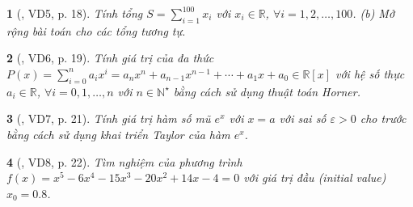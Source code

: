 \documentclass{article}
\newtheorem{baitoan}{}
\begin{document}
\begin{baitoan}[\cite{Doanh_Tuan_Pascal}, VD5, p. 18]
	Tính tổng $S = \sum_{i=1}^{100} x_i$ với $x_i\in\mathbb{R}$, $\forall i = 1,2,\ldots,100$. (b) Mở rộng bài toán cho các tổng tương tự.
\end{baitoan}

\begin{baitoan}[\cite{Doanh_Tuan_Pascal}, VD6, p. 19]
	Tính giá trị của đa thức $P(x) = \sum_{i=0}^n a_ix^i = a_nx^n + a_{n-1}x^{n-1} + \cdots + a_1x + a_0\in\mathbb{R}[x]$ với hệ số thực $a_i\in\mathbb{R}$, $\forall i = 0,1,\ldots,n$ với $n\in\mathbb{N}^\star$ bằng cách sử dụng thuật toán Horner.
\end{baitoan}

\begin{baitoan}[\cite{Doanh_Tuan_Pascal}, VD7, p. 21]
	Tính giá trị hàm số mũ $e^x$ với $x = a$ với sai số $\varepsilon > 0$ cho trước bằng cách sử dụng khai triển Taylor của hàm $e^x$.
\end{baitoan}

\begin{baitoan}[\cite{Doanh_Tuan_Pascal}, VD8, p. 22]
	Tìm nghiệm của phương trình $f(x) = x^5 - 6x^4 - 15x^3 - 20x^2 + 14x - 4 = 0$ với giá trị đầu (initial value) $x_0 = 0.8$.
\end{baitoan}
\end{document}
